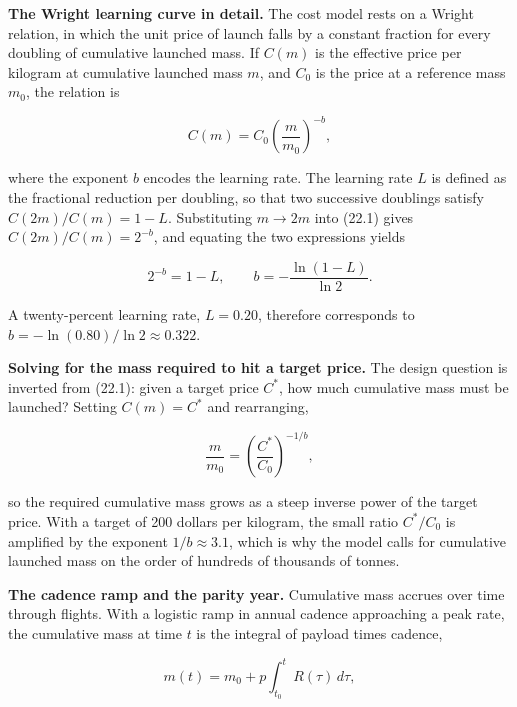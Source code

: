 \documentclass[
  11pt,
  openany,
  oneside]{book}
\begin{document}
\textbf{The Wright learning curve in detail.} The cost model rests on a
Wright relation, in which the unit price of launch falls by a constant
fraction for every doubling of cumulative launched mass. If \(C(m)\) is
the effective price per kilogram at cumulative launched mass \(m\), and
\(C_0\) is the price at a reference mass \(m_0\), the relation is

\begin{equation}
C(m) = C_0 \left( \frac{m}{m_0} \right)^{-b}, \tag{22.1}
\end{equation}

where the exponent \(b\) encodes the learning rate. The learning rate
\(L\) is defined as the fractional reduction per doubling, so that two
successive doublings satisfy \(C(2m)/C(m) = 1 - L\). Substituting
\(m \to 2m\) into (22.1) gives \(C(2m)/C(m) = 2^{-b}\), and equating the
two expressions yields

\begin{equation}
2^{-b} = 1 - L, \qquad b = -\frac{\ln(1 - L)}{\ln 2}. \tag{22.2}
\end{equation}

A twenty-percent learning rate, \(L = 0.20\), therefore corresponds to
\(b = -\ln(0.80)/\ln 2 \approx 0.322\).

\textbf{Solving for the mass required to hit a target price.} The design
question is inverted from (22.1): given a target price \(C^\ast\), how
much cumulative mass must be launched? Setting \(C(m) = C^\ast\) and
rearranging,

\begin{equation}
\frac{m}{m_0} = \left( \frac{C^\ast}{C_0} \right)^{-1/b}, \tag{22.3}
\end{equation}

so the required cumulative mass grows as a steep inverse power of the
target price. With a target of 200 dollars per kilogram, the small ratio
\(C^\ast/C_0\) is amplified by the exponent \(1/b \approx 3.1\), which
is why the model calls for cumulative launched mass on the order of
hundreds of thousands of tonnes.

\textbf{The cadence ramp and the parity year.} Cumulative mass accrues
over time through flights. With a logistic ramp in annual cadence
approaching a peak rate, the cumulative mass at time \(t\) is the
integral of payload times cadence,

\begin{equation}
m(t) = m_0 + p \int_{t_0}^{t} R(\tau)\, d\tau, \tag{22.4}
\end{equation}
\end{document}
